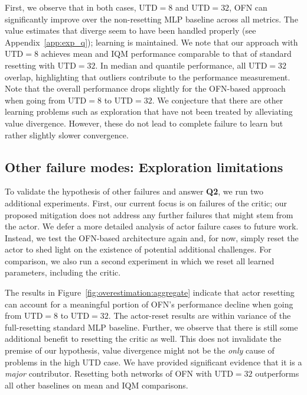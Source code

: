 First, we observe that in both cases, $\mathrm{UTD}=8$ and $\mathrm{UTD}=32$, OFN can significantly improve over the non-resetting MLP baseline across all metrics. The value estimates that diverge seem to have been handled properly (see Appendix~\ref{app:exp_q}); learning is maintained. We note that our approach with $\mathrm{UTD}=8$ achieves mean and IQM performance comparable to that of standard resetting with $\mathrm{UTD}=32$. In median and quantile performance, all $\mathrm{UTD}=32$ overlap, highlighting that outliers contribute to the performance measurement. Note that the overall performance drops slightly for the OFN-based approach when going from $\mathrm{UTD}=8$ to $\mathrm{UTD}=32$. We conjecture that there are other learning problems such as exploration that have not been treated by alleviating value divergence. However, these do not lead to complete failure to learn but rather slightly slower convergence. %

\subsection{Other failure modes: Exploration limitations} \label{sec:otherfailure}


To validate the hypothesis of other failures and answer \textbf{Q2}, we run two additional experiments. First, our current focus is on failures of the critic; our proposed mitigation does not address any further failures that might stem from the actor. We defer a more detailed analysis of actor failure cases to future work. Instead, we test the OFN-based architecture again and, for now, simply reset the actor to shed light on the existence of potential additional challenges.
For comparison, we also run a second experiment in which we reset all learned parameters, including the critic.

The results in Figure~\ref{fig:overestimation:aggregate} indicate that actor resetting can account for a meaningful portion of OFN's performance decline when going from $\mathrm{UTD}=8$ to $\mathrm{UTD}=32$. The actor-reset results are within variance of the full-resetting standard MLP baseline. Further, we observe that there is still some additional benefit to resetting the critic as well. 
This does not invalidate the premise of our hypothesis, value divergence might not be the \emph{only} cause of problems in the high UTD case. We have provided significant evidence that it is a \emph{major} contributor.
Resetting both networks of OFN with $\mathrm{UTD}=32$  outperforms all other baselines on mean and IQM comparisons. %



